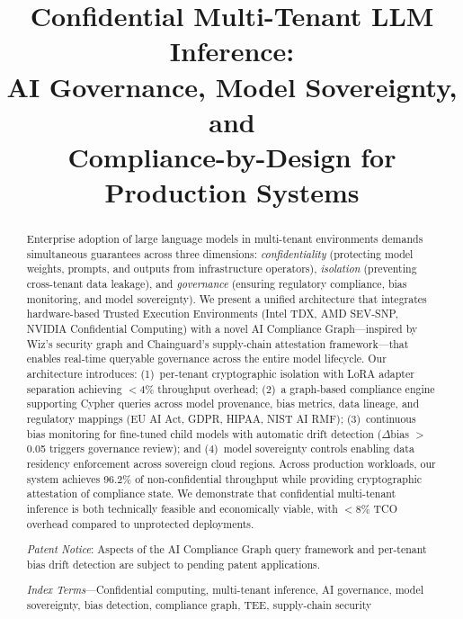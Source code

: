 \documentclass[conference,10pt]{IEEEtran}
\begin{document}
\title{Confidential Multi-Tenant LLM Inference:\\AI Governance, Model Sovereignty, and\\Compliance-by-Design for Production Systems}
\author{
}
\maketitle

\begin{abstract}
Enterprise adoption of large language models in multi-tenant environments demands simultaneous guarantees across three dimensions: \emph{confidentiality} (protecting model weights, prompts, and outputs from infrastructure operators), \emph{isolation} (preventing cross-tenant data leakage), and \emph{governance} (ensuring regulatory compliance, bias monitoring, and model sovereignty). We present a unified architecture that integrates hardware-based Trusted Execution Environments (Intel TDX, AMD SEV-SNP, NVIDIA Confidential Computing) with a novel AI Compliance Graph---inspired by Wiz's security graph and Chainguard's supply-chain attestation framework---that enables real-time queryable governance across the entire model lifecycle. Our architecture introduces: (1)~per-tenant cryptographic isolation with LoRA adapter separation achieving $<$4\% throughput overhead; (2)~a graph-based compliance engine supporting Cypher queries across model provenance, bias metrics, data lineage, and regulatory mappings (EU AI Act, GDPR, HIPAA, NIST AI RMF); (3)~continuous bias monitoring for fine-tuned child models with automatic drift detection ($\Delta$bias $>$ 0.05 triggers governance review); and (4)~model sovereignty controls enabling data residency enforcement across sovereign cloud regions. Across production workloads, our system achieves 96.2\% of non-confidential throughput while providing cryptographic attestation of compliance state. We demonstrate that confidential multi-tenant inference is both technically feasible and economically viable, with $<$8\% TCO overhead compared to unprotected deployments.

\emph{Patent Notice}: Aspects of the AI Compliance Graph query framework and per-tenant bias drift detection are subject to pending patent applications.

\emph{Index Terms}---Confidential computing, multi-tenant inference, AI governance, model sovereignty, bias detection, compliance graph, TEE, supply-chain security
\end{abstract}
\end{document}
